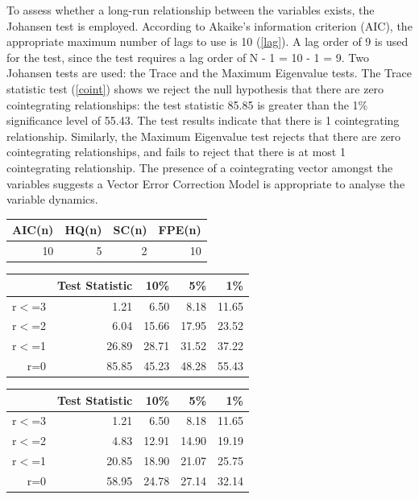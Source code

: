 \documentclass[11pt,preprint, authoryear]{elsarticle}
\let\origtable\table
\let\endorigtable\endtable
\renewenvironment{table}[1][2] {
    \expandafter\origtable\expandafter[H]
} {
    \endorigtable
}
\numberwithin{equation}{section}
\numberwithin{figure}{section}
\numberwithin{table}{section}
\begin{document}
To assess whether a long-run relationship between the variables exists,
the Johansen test is employed. According to Akaike's information
criterion (AIC), the appropriate maximum number of lags to use is 10
(\ref{lag}). A lag order of 9 is used for the test, since the test
requires a lag order of N - 1 = 10 - 1 = 9. Two Johansen tests are used:
the Trace and the Maximum Eigenvalue tests. The Trace statistic test
(\ref{coint}) shows we reject the null hypothesis that there are zero
cointegrating relationships: the test statistic 85.85 is greater than
the 1\% significance level of 55.43. The test results indicate that
there is 1 cointegrating relationship. Similarly, the Maximum Eigenvalue
test rejects that there are zero cointegrating relationships, and fails
to reject that there is at most 1 cointegrating relationship. The
presence of a cointegrating vector amongst the variables suggests a
Vector Error Correction Model is appropriate to analyse the variable
dynamics.

\begin{table}[H]
\centering
\begin{tabular}{rrrr}
  \hline
AIC(n) & HQ(n) & SC(n) & FPE(n) \\ 
  \hline
 10 &   5 &   2 &  10 \\ 
   \hline
\end{tabular}
\caption{Optimal Lag Selection \label{lag}} 
\end{table}

\begin{table}[H]
\centering
\begin{tabular}{rrrrr}
  \hline
 & Test Statistic & 10\% & 5\% & 1\% \\ 
  \hline
r$<$=3 & 1.21 & 6.50 & 8.18 & 11.65 \\ 
  r$<$=2 & 6.04 & 15.66 & 17.95 & 23.52 \\ 
  r$<$=1 & 26.89 & 28.71 & 31.52 & 37.22 \\ 
  r=0 & 85.85 & 45.23 & 48.28 & 55.43 \\ 
   \hline
\end{tabular}
\caption{Johansen Trace Test for Cointegration Results\label{coint}} 
\end{table}
\begin{table}[H]
\centering
\begin{tabular}{rrrrr}
  \hline
 & Test Statistic & 10\% & 5\% & 1\% \\ 
  \hline
r$<$=3 & 1.21 & 6.50 & 8.18 & 11.65 \\ 
  r$<$=2 & 4.83 & 12.91 & 14.90 & 19.19 \\ 
  r$<$=1 & 20.85 & 18.90 & 21.07 & 25.75 \\ 
  r=0 & 58.95 & 24.78 & 27.14 & 32.14 \\ 
   \hline
\end{tabular}
\caption{Johansen Eigenvalue Test for Cointegration Results\label{eigen}} 
\end{table}
\end{document}
